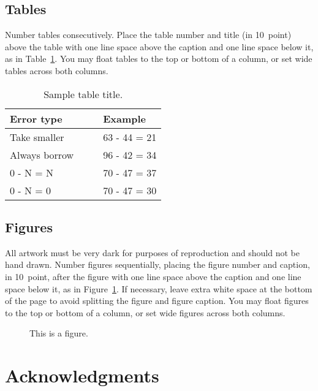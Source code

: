 \documentclass[10pt,letterpaper]{article}
\begin{document}
\subsection{Tables}

Number tables consecutively. Place the table number and title (in
10~point) above the table with one line space above the caption and
one line space below it, as in Table~\ref{sample-table}. You may float
tables to the top or bottom of a column, or set wide tables across
both columns.

\begin{table}[!ht]
\begin{center} 
\caption{Sample table title.} 
\label{sample-table} 
\vskip 0.12in
\begin{tabular}{ll} 
\hline
Error type    &  Example \\
\hline
Take smaller        &   63 - 44 = 21 \\
Always borrow~~~~   &   96 - 42 = 34 \\
0 - N = N           &   70 - 47 = 37 \\
0 - N = 0           &   70 - 47 = 30 \\
\hline
\end{tabular} 
\end{center} 
\end{table}


\subsection{Figures}

All artwork must be very dark for purposes of reproduction and should
not be hand drawn. Number figures sequentially, placing the figure
number and caption, in 10~point, after the figure with one line space
above the caption and one line space below it, as in
Figure~\ref{sample-figure}. If necessary, leave extra white space at
the bottom of the page to avoid splitting the figure and figure
caption. You may float figures to the top or bottom of a column, or
set wide figures across both columns.

\begin{figure}[ht]
\begin{center}
\end{center}
\caption{This is a figure.} 
\label{sample-figure}
\end{figure}


\section{Acknowledgments}
\end{document}
